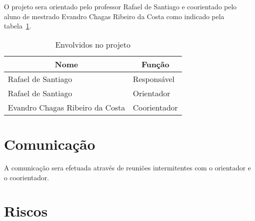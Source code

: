 \documentclass[
  12pt,
  openright,
  twoside,
  a4paper,
  english,
  brazil
]{abntex2}
\begin{document}
O projeto sera orientado pelo professor Rafael de Santiago e coorientado pelo aluno de mestrado Evandro Chagas Ribeiro da Costa como indicado pela tabela~\ref{tab:envolvidos}.

\begin{table}[h]
  \caption{Envolvidos no projeto}\label{tab:envolvidos}
    \centering
      \begin{tabular}{@{}ll@{}}
        \toprule
        \multicolumn{1}{c}{Nome} & \multicolumn{1}{c}{Função} \\
        \midrule
        Rafael de Santiago & Responsável \\
        Rafael de Santiago & Orientador \\
        Evandro Chagas Ribeiro da Costa & Coorientador \\
        \bottomrule
      \end{tabular}
\end{table}

\section{Comunicação}\label{cap:comunicacao}

A comunicação sera efetuada através de reuniões intermitentes com o orientador e o coorientador.

\section{Riscos}\label{cap:riscos}

\begin{table}[h]
  \caption{Riscos do projeto}\label{tab:riscos}
\end{table}

\postextual{}


\end{document}
